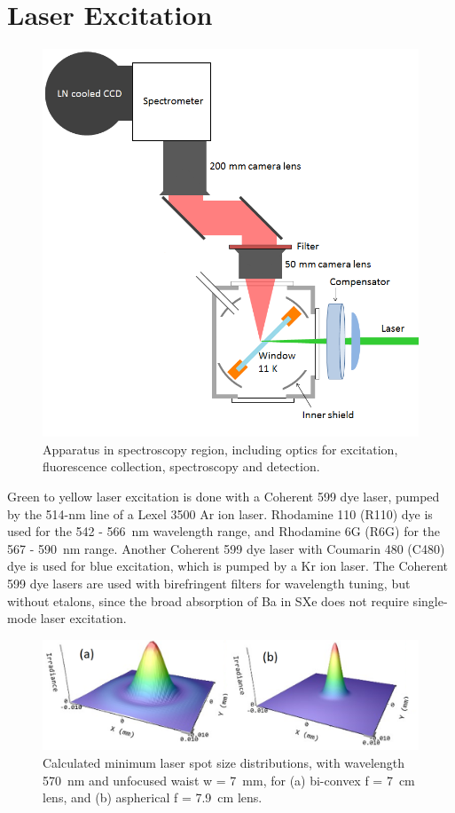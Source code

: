 
\section{Laser Excitation}

\begin{figure} %
        \centering
                \includegraphics[width=.7\textwidth]{figures/window_etc_justOptics.png}
                \caption{Apparatus in spectroscopy region, including optics for excitation, fluorescence collection, spectroscopy and detection.}
\label{fig:endOfBeamOptics}
\end{figure}

Green to yellow laser excitation is done with a Coherent 599 dye laser, pumped by the 514-nm line of a Lexel 3500 Ar ion laser.  Rhodamine 110 (R110) dye is used for the 542 - 566~nm wavelength range, and Rhodamine 6G (R6G) for the 567 - 590~nm range.  Another Coherent 599 dye laser with Coumarin 480 (C480) dye is used for blue excitation, which is pumped by a Kr ion laser.  The Coherent 599 dye lasers are used with birefringent filters for wavelength tuning, but without etalons, since the broad absorption of Ba in SXe does not require single-mode laser excitation.

\begin{figure} %
        \centering
                \includegraphics[width=.7\textwidth]{figures/DFairbank_aber.png}
                \caption{Calculated minimum laser spot size distributions, with wavelength 570~nm and unfocused waist w = 7~mm, for (a) bi-convex f = 7~cm lens, and (b) aspherical f = 7.9~cm lens.}
\label{fig:DFairbank}
\end{figure}

